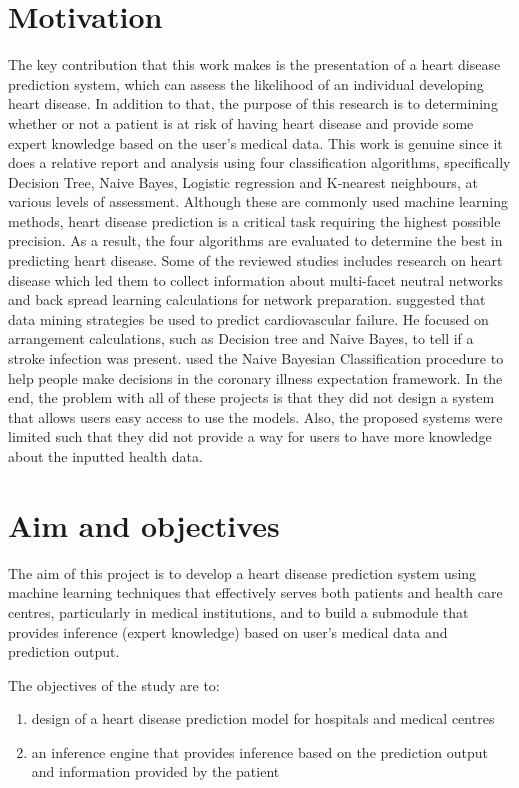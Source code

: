 \section{Motivation}
The key contribution that this work makes is the presentation of a heart disease prediction system, which can assess the likelihood of an individual developing heart disease. In addition to that, the purpose of this research is to determining whether or not a patient is at risk of having heart disease and provide some expert knowledge based on the user's medical data. This work is genuine since it does a relative report and analysis using four classification algorithms, specifically Decision Tree, Naive Bayes, Logistic regression and K-nearest neighbours, at various levels of assessment. Although these are commonly used machine learning methods, heart disease prediction is a critical task requiring the highest possible precision. As a result, the four algorithms are evaluated to determine the best in predicting heart disease. Some of the reviewed studies includes
 research on heart disease which led them to collect information about multi-facet neutral networks and back spread learning calculations for network preparation. \cite{srinivas2010applications} suggested that data mining strategies be used to predict cardiovascular failure. He focused on arrangement calculations, such as Decision tree and Naive Bayes, to tell if a stroke infection was present. \cite{pattekari2012prediction} used the Naive Bayesian Classification procedure to help people make decisions in the coronary illness expectation framework. In the end, the problem with all of these projects is that they did not design a system that allows users easy access to use the models. Also, the proposed systems were limited such that they did not provide a way for users to have more knowledge about the inputted health data.

\section{Aim and objectives}
The aim of this project is to develop a heart disease prediction system using machine learning techniques that effectively serves both patients and health care centres, particularly in medical institutions, and to build a submodule that provides inference (expert knowledge) based on user's medical data and prediction output. 

The objectives of the study are to:
\begin{enumerate}[label=(\alph*)]
	\item  design  of a heart disease prediction model for hospitals and medical centres
	\item an inference engine that provides inference based on the prediction output and information provided by the patient
\end{enumerate}

